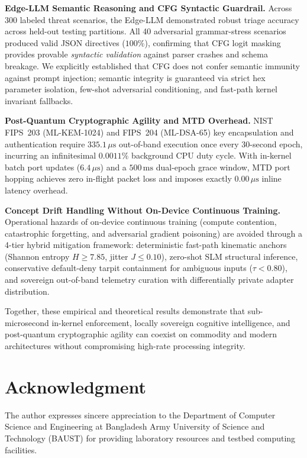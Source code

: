 \documentclass[journal]{IEEEtran}
\renewcommand{\_}{\textunderscore\allowbreak}
\begin{document}
\textbf{Edge-LLM Semantic Reasoning and CFG Syntactic Guardrail.}
Across 300 labeled threat scenarios, the Edge-LLM demonstrated robust triage accuracy across
held-out testing partitions. All 40 adversarial grammar-stress scenarios produced valid JSON
directives ($100\%$), confirming that CFG logit masking provides provable \textit{syntactic validation}
against parser crashes and schema breakage. We explicitly established that CFG does not confer semantic
immunity against prompt injection; semantic integrity is guaranteed via strict hex parameter isolation,
few-shot adversarial conditioning, and fast-path kernel invariant fallbacks.

\textbf{Post-Quantum Cryptographic Agility and MTD Overhead.}
NIST FIPS~203 (ML-KEM-1024) and FIPS~204 (ML-DSA-65) key encapsulation and authentication require
$335.1\,\mu\text{s}$ out-of-band execution once every 30-second epoch, incurring an infinitesimal
$0.0011\%$ background CPU duty cycle. With in-kernel batch port updates ($6.4\,\mu\text{s}$) and a
$500\,\text{ms}$ dual-epoch grace window, MTD port hopping achieves zero in-flight packet loss and
imposes exactly $0.00\,\mu\text{s}$ inline latency overhead.

\textbf{Concept Drift Handling Without On-Device Continuous Training.}
Operational hazards of on-device continuous training (compute contention, catastrophic forgetting, and
adversarial gradient poisoning) are avoided through a 4-tier hybrid mitigation framework: deterministic
fast-path kinematic anchors (Shannon entropy $H \ge 7.85$, jitter $J \le 0.10$), zero-shot SLM
structural inference, conservative default-deny tarpit containment for ambiguous inputs ($\tau < 0.80$),
and sovereign out-of-band telemetry curation with differentially private adapter distribution.

Together, these empirical and theoretical results demonstrate that sub-microsecond in-kernel enforcement,
locally sovereign cognitive intelligence, and post-quantum cryptographic agility can coexist on commodity
and modern architectures without compromising high-rate processing integrity.

\section*{Acknowledgment}
The author expresses sincere appreciation to the Department of Computer Science
and Engineering at Bangladesh Army University of Science and Technology (BAUST)
for providing laboratory resources and testbed computing facilities.
\end{document}
